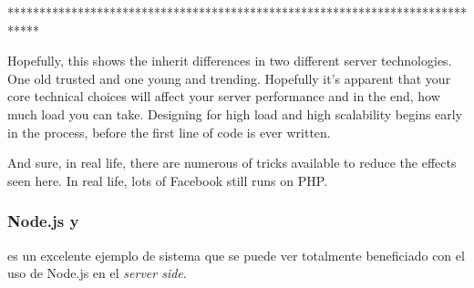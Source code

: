 %
%


*****************************************************************************


Hopefully, this shows the inherit differences in two different server technologies. One old trusted and one young and trending. Hopefully it’s apparent that your core technical choices will affect your server performance and in the end, how much load you can take. Designing for high load and high scalability begins early in the process, before the first line of code is ever written.

And sure, in real life, there are numerous of tricks available to reduce the effects seen here. In real life, lots of Facebook still runs on PHP.


\subsubsection{Node.js y }

 es un excelente ejemplo de sistema que se puede ver totalmente beneficiado con el uso de Node.js en el \textit{server side}. 

